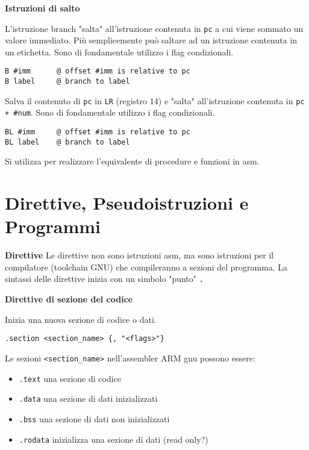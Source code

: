 \begin{defn}
\textbf{Istruzioni di salto}

L'istruzione branch "salta" all'istruzione contenuta in \texttt{pc}  a cui viene sommato un valore immediato.
Più semplicemente può saltare ad un istruzione contenuta in un etichetta.
Sono di fondamentale utilizzo i flag condizionali.
\begin{lstlisting}[style=arm]
B #imm		@ offset #imm is relative to pc
B label		@ branch to label
\end{lstlisting}

Salva il contenuto di \texttt{pc} in \texttt{LR} (registro 14) e "salta" all'istruzione contenuta in \texttt{pc + \#num}. Sono di fondamentale utilizzo i flag condizionali.
\begin{lstlisting}[style=arm]
BL #imm		@ offset #imm is relative to pc
BL label	@ branch to label
\end{lstlisting}
Si utilizza per realizzare l'equivalente di procedure e funzioni in asm.
\end{defn}

\section{Direttive, Pseudoistruzioni e Programmi}

\begin{defn}
\textbf{Direttive}
Le direttive non sono istruzioni asm, ma sono istruzioni per il compilatore (toolchain GNU) che compileranno a sezioni del programma. La sintassi delle direttive inizia con un simbolo "punto" \texttt{.}
\end{defn}

\begin{defn}
\textbf{Direttive di sezione del codice}

Inizia una nuova sezione di codice o dati.
\begin{lstlisting}[style=arm]
.section <section_name> {, "<flags>"}
\end{lstlisting}

Le sezioni \texttt{<section\_name>} nell'assembler ARM gnu possono essere:
\begin{itemize}
	\item \texttt{.text} una sezione di codice
	\item \texttt{.data} una sezione di dati inizializzati
	\item \texttt{.bss} una sezione di dati non inizializzati
	\item \texttt{.rodata} inizializza una sezione di dati (read only?)
\end{itemize}
\end{defn}


